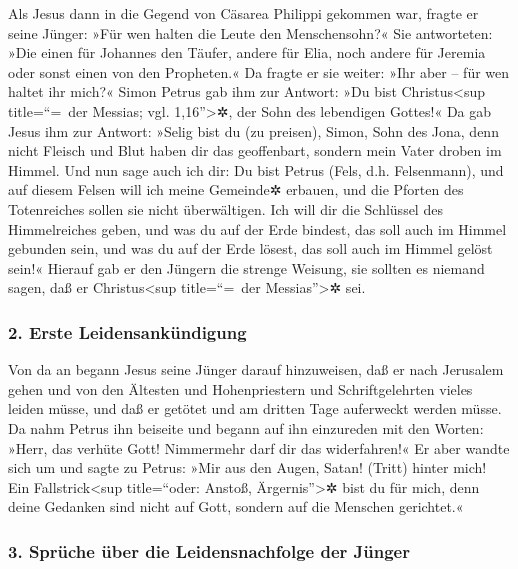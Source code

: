  Als Jesus dann in die Gegend von Cäsarea Philippi
gekommen war, fragte er seine Jünger: »Für wen halten die Leute den
Menschensohn?«  Sie antworteten: »Die einen für Johannes
den Täufer, andere für Elia, noch andere für Jeremia oder sonst einen
von den Propheten.«  Da fragte er sie weiter: »Ihr aber
-- für wen haltet ihr mich?«  Simon Petrus gab ihm zur
Antwort: »Du bist Christus\textless sup title=``=~der Messias; vgl.
1,16''\textgreater✲, der Sohn des lebendigen Gottes!«  Da
gab Jesus ihm zur Antwort: »Selig bist du (zu preisen), Simon, Sohn des
Jona, denn nicht Fleisch und Blut haben dir das geoffenbart, sondern
mein Vater droben im Himmel.  Und nun sage auch ich dir:
Du bist Petrus (Fels, d.h. Felsenmann), und auf diesem Felsen will ich
meine Gemeinde✲ erbauen, und die Pforten des Totenreiches sollen sie
nicht überwältigen.  Ich will dir die Schlüssel des
Himmelreiches geben, und was du auf der Erde bindest, das soll auch im
Himmel gebunden sein, und was du auf der Erde lösest, das soll auch im
Himmel gelöst sein!«  Hierauf gab er den Jüngern die
strenge Weisung, sie sollten es niemand sagen, daß er
Christus\textless sup title=``=~der Messias''\textgreater✲ sei.

\hypertarget{erste-leidensankuxfcndigung}{%
\subsubsection{2. Erste
Leidensankündigung}\label{erste-leidensankuxfcndigung}}

 Von da an begann Jesus seine Jünger darauf hinzuweisen,
daß er nach Jerusalem gehen und von den Ältesten und Hohenpriestern und
Schriftgelehrten vieles leiden müsse, und daß er getötet und am dritten
Tage auferweckt werden müsse.  Da nahm Petrus ihn
beiseite und begann auf ihn einzureden mit den Worten: »Herr, das
verhüte Gott! Nimmermehr darf dir das widerfahren!«  Er
aber wandte sich um und sagte zu Petrus: »Mir aus den Augen, Satan!
(Tritt) hinter mich! Ein Fallstrick\textless sup title=``oder: Anstoß,
Ärgernis''\textgreater✲ bist du für mich, denn deine Gedanken sind nicht
auf Gott, sondern auf die Menschen gerichtet.«

\hypertarget{spruxfcche-uxfcber-die-leidensnachfolge-der-juxfcnger}{%
\subsubsection{3. Sprüche über die Leidensnachfolge der
Jünger}\label{spruxfcche-uxfcber-die-leidensnachfolge-der-juxfcnger}}

